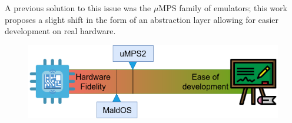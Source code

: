 \documentclass[table,xcdraw]{beamer}
\begin{document}
\begin{frame}[fragile]
    A previous solution to this issue was the $\mu$MPS family of emulators; this
    work proposes a slight shift in the form of an abstraction layer allowing for
    easier development on real hardware.
    \bigskip

    \begin{figure}[b]
    \includegraphics[scale=0.54]{scale.png}
    \end{figure}

\end{frame}
\end{document}
